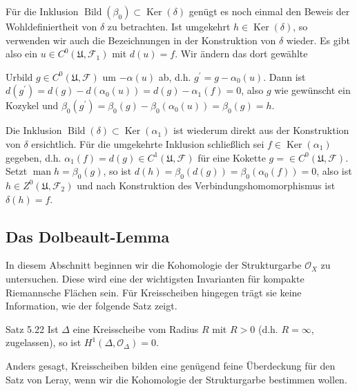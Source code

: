 \documentclass[10pt, letterpaper]{article}
\begin{document}
Für die Inklusion $\operatorname{Bild}\left(\beta_{0}\right) \subset \operatorname{Ker}(\delta)$ genügt es noch einmal den Beweis der Wohldefiniertheit von $\delta$ zu betrachten. Ist umgekehrt $h \in \operatorname{Ker}(\delta)$, so verwenden wir auch die Bezeichnungen in der Konstruktion von $\delta$ wieder. Es gibt also ein $u \in C^{0}\left(\mathfrak{U}, \mathcal{F}_{1}\right)$ mit $d(u)=f$. Wir ändern das dort gewählte

Urbild $g \in C^{0}(\mathfrak{U}, \mathcal{F})$ um $-\alpha(u)$ ab, d.h. $g^{\prime}=g-\alpha_{0}(u)$. Dann ist $d\left(g^{\prime}\right)= d(g)-d\left(\alpha_{0}(u)\right)=d(g)-\alpha_{1}(f)=0$, also $g$ wie gewünscht ein Kozykel und $\beta_{0}\left(g^{\prime}\right)=\beta_{0}(g)-\beta_{0}\left(\alpha_{0}(u)\right)=\beta_{0}(g)=h$.

Die Inklusion $\operatorname{Bild}(\delta) \subset \operatorname{Ker}\left(\alpha_{1}\right)$ ist wiederum direkt aus der Konstruktion von $\delta$ ersichtlich. Für die umgekehrte Inklusion schließlich sei $f \in \operatorname{Ker}\left(\alpha_{1}\right)$ gegeben, d.h. $\alpha_{1}(f)=d(g) \in C^{1}(\mathfrak{U}, \mathcal{F})$ für eine Kokette $g=\in C^{0}(\mathfrak{U}, \mathcal{F})$. Setzt $\operatorname{man} h=\beta_{0}(g)$, so ist $d(h)=\beta_{0}(d(g))=\beta_{0}\left(\alpha_{0}(f)\right)=0$, also ist $h \in Z^{0}\left(\mathfrak{U}, \mathcal{F}_{2}\right)$ und nach Konstruktion des Verbindungshomomorphismus ist $\delta(h)=f$.

\subsection {Das Dolbeault-Lemma}
In diesem Abschnitt beginnen wir die Kohomologie der Strukturgarbe $\mathcal{O}_{X}$ zu untersuchen. Diese wird eine der wichtigsten Invarianten für kompakte Riemannsche Flächen sein. Für Kreisscheiben hingegen trägt sie keine Information, wie der folgende Satz zeigt.

Satz 5.22 Ist $\Delta$ eine Kreisscheibe vom Radius $R$ mit $R>0$ (d.h. $R=\infty$, zugelassen), so ist $H^{1}\left(\Delta, \mathcal{O}_{\Delta}\right)=0$.

Anders gesagt, Kreisscheiben bilden eine genügend feine Überdeckung für den Satz von Leray, wenn wir die Kohomologie der Strukturgarbe bestimmen wollen.
\end{document}

